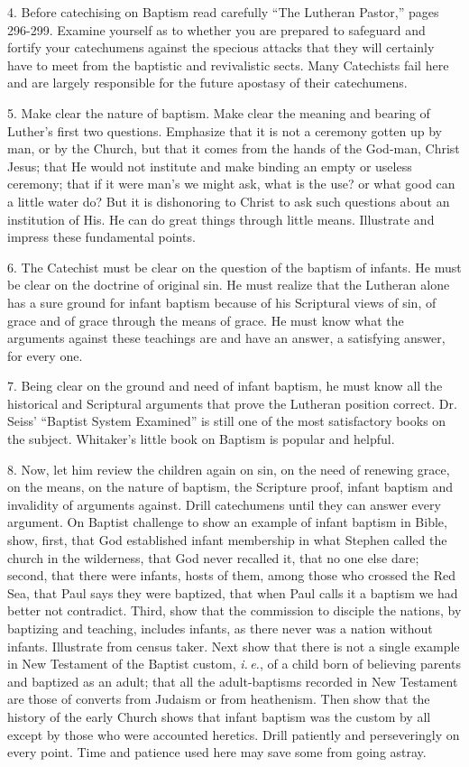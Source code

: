 4. Before catechising on Baptism read carefully “The Lutheran Pastor,” pages 296-299. Examine yourself as to whether you are prepared to safeguard and fortify your catechumens against the specious attacks that they will certainly have to meet from the baptistic and revivalistic sects. Many Catechists fail here and are largely responsible for the future apostasy of their catechumens.

5. Make clear the nature of baptism. Make clear the meaning and bearing of Luther’s first two questions. Emphasize that it is not a ceremony gotten up by man, or by the Church, but that it comes from the hands of the God-man, Christ Jesus; that He would not institute and make binding an empty or useless ceremony; that if it were man’s we might ask, what is the use? or what good can a little water do? But it is dishonoring to Christ to ask such questions about an institution of His. He can do great things through little means. Illustrate and impress these fundamental points. 

6. The Catechist must be clear on the question of the baptism of infants. He must be clear on the doctrine of original sin. He must realize that the Lutheran alone has a sure ground for infant baptism because of his Scriptural views of sin, of grace and of grace through the means of grace. He must know what the arguments against these teachings are and have an answer, a satisfying answer, for every one. 

7. Being clear on the ground and need of infant baptism, he must know all the historical and Scriptural arguments that prove the Lutheran position correct. Dr. Seiss’ “Baptist System Examined” is still one of the most satisfactory books on the subject. Whitaker’s little book on Baptism is popular and helpful.

8. Now, let him review the children again on sin, on the need of renewing grace, on the means, on the nature of baptism, the Scripture proof, infant baptism and invalidity of arguments against. Drill catechumens until they can answer every argument. On Baptist challenge to show an example of infant baptism in Bible, show, first, that God established infant membership in what Stephen called the church in the wilderness, that God never recalled it, that no one else dare; second, that there were infants, hosts of them, among those who crossed the Red Sea, that Paul says they were baptized, that 
when Paul calls it a baptism we had better not contradict. Third, show that the commission to disciple the nations, by baptizing and teaching, includes infants, as there never was a nation without infants. Illustrate from census taker. Next show that there is not a single example in New Testament of the Baptist custom, \emph{i.\,e.}, of a child born of believing parents and baptized as an adult; that all the adult-baptisms recorded in New Testament are those of converts from Judaism or from heathenism. Then show that the history of the early Church shows that infant baptism was the custom by all except by those who were accounted heretics. Drill patiently and perseveringly on every point. Time and patience used here may save some from going astray.

